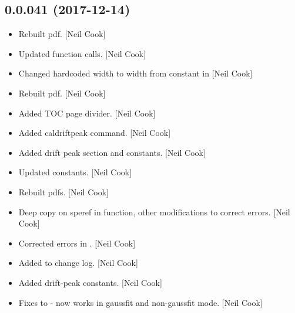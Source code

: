 \documentclass[a4paper,10pt,english]{report}
\begin{document}
\subsection{0.0.041 (2017-12-14)}
\label{\detokenize{misc/changelog:id511}}\begin{itemize}
\item {} 
Rebuilt pdf. {[}Neil Cook{]}

\item {} 
Updated  function calls. {[}Neil Cook{]}

\item {} 
Changed hardcoded width to width from constant in  {[}Neil
Cook{]}

\item {} 
Rebuilt pdf. {[}Neil Cook{]}

\item {} 
Added TOC page divider. {[}Neil Cook{]}

\item {} 
Added caldriftpeak command. {[}Neil Cook{]}

\item {} 
Added drift peak section and constants. {[}Neil Cook{]}

\item {} 
Updated constants. {[}Neil Cook{]}

\item {} 
Rebuilt pdfs. {[}Neil Cook{]}

\item {} 
Deep copy on speref in  function, other modifications
to correct errors. {[}Neil Cook{]}

\item {} 
Corrected errors in . {[}Neil Cook{]}

\item {} 
Added to change log. {[}Neil Cook{]}

\item {} 
Added drift-peak constants. {[}Neil Cook{]}

\item {} 
Fixes to  - now works in gaussfit and non-gaussfit mode.
{[}Neil Cook{]}

\end{itemize}
\end{document}
